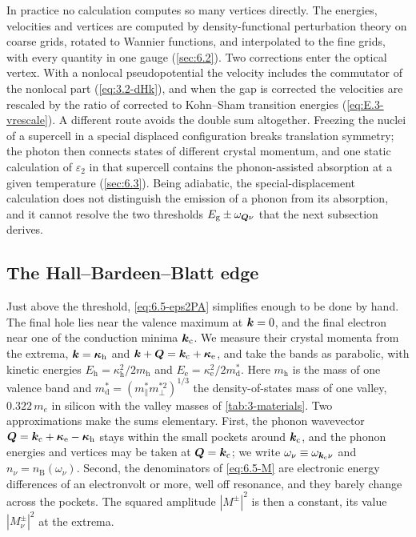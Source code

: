 In practice no calculation computes so many vertices directly. The energies, velocities and vertices are computed by density-functional perturbation theory on coarse grids, rotated to Wannier functions, and interpolated to the fine grids, with every quantity in one gauge (\cref{sec:6.2}). Two corrections enter the optical vertex. With a nonlocal pseudopotential the velocity includes the commutator of the nonlocal part (\cref{eq:3.2-dHk}), and when the gap is corrected the velocities are rescaled by the ratio of corrected to Kohn--Sham transition energies (\cref{eq:E.3-vrescale}). A different route avoids the double sum altogether. Freezing the nuclei of a supercell in a special displaced configuration breaks translation symmetry; the photon then connects states of different crystal momentum, and one static calculation of $\varepsilon_2$ in that supercell contains the phonon-assisted absorption at a given temperature (\cref{sec:6.3}). Being adiabatic, the special-displacement calculation does not distinguish the emission of a phonon from its absorption, and it cannot resolve the two thresholds $E_{\mathrm{g}} \pm \omega_{\bm{Q}\nu}$ that the next subsection derives.

\subsection{The Hall--Bardeen--Blatt edge}

Just above the threshold, \cref{eq:6.5-eps2PA} simplifies enough to be done by hand. The final hole lies near the valence maximum at $\bm{k} = 0$, and the final electron near one of the conduction minima $\bm{k}_{\mathrm{c}}$. We measure their crystal momenta from the extrema, $\bm{k} = \bm{\kappa}_{\mathrm{h}}$ and $\bm{k} + \bm{Q} = \bm{k}_{\mathrm{c}} + \bm{\kappa}_{\mathrm{e}}$, and take the bands as parabolic, with kinetic energies $E_{\mathrm{h}} = \kappa_{\mathrm{h}}^2/2m_{\mathrm{h}}$ and $E_{\mathrm{e}} = \kappa_{\mathrm{e}}^2/2m^*_{\mathrm{d}}$. Here $m_{\mathrm{h}}$ is the mass of one valence band and $m^*_{\mathrm{d}} = (m^*_\parallel m^{*2}_\perp)^{1/3}$ the density-of-states mass of one valley, $0.322\,m_e$ in silicon with the valley masses of \cref{tab:3-materials}. Two approximations make the sums elementary. First, the phonon wavevector $\bm{Q} = \bm{k}_{\mathrm{c}} + \bm{\kappa}_{\mathrm{e}} - \bm{\kappa}_{\mathrm{h}}$ stays within the small pockets around $\bm{k}_{\mathrm{c}}$, and the phonon energies and vertices may be taken at $\bm{Q} = \bm{k}_{\mathrm{c}}$; we write $\omega_\nu \equiv \omega_{\bm{k}_{\mathrm{c}}\nu}$ and $n_\nu = n_{\mathrm{B}}(\omega_\nu)$. Second, the denominators of \cref{eq:6.5-M} are electronic energy differences of an electronvolt or more, well off resonance, and they barely change across the pockets. The squared amplitude $|M^\pm|^2$ is then a constant, its value $|M^\pm_\nu|^2$ at the extrema.

